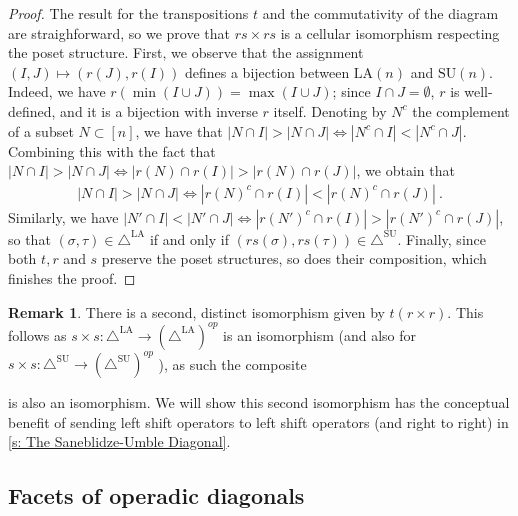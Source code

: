 \documentclass{amsart}
\theoremstyle{definition}
\newtheorem{remark}[theorem]{Remark}
\newcommand{\SU}{\mathrm{SU}}
\newcommand{\LA}{\mathrm{LA}}
\newcommand{\SUD}{\triangle^{\mathrm{SU}}}
\newcommand{\LAD}{\triangle^{\mathrm{LA}}}
\newcommand{\op}{\mathrm{op}}
\begin{document}
\begin{proof}
    The result for the transpositions $t$ and the commutativity of the diagram are straighforward, so we prove that $rs\times rs$ is a cellular isomorphism respecting the poset structure. 
    First, we observe that the assignment $(I,J) \mapsto (r(J),r(I))$ defines a bijection between $\LA(n)$ and $\SU(n)$. 
    Indeed, we have $r(\min(I\cup J))=\max(I\cup J)$; since $I \cap J = \emptyset$, $r$ is well-defined, and it is a bijection with inverse $r$ itself.  
    Denoting by $N^c$ the complement of a subset $N \subset [n]$, we have that $|N \cap I| > |N\cap J| \iff |N^c \cap I|< |N^c \cap J|$.
    Combining this with the fact that $|N \cap I| > |N\cap J| \iff |r(N) \cap r(I)| > |r(N) \cap r(J)|$, we obtain that 
    \begin{eqnarray*}
        |N \cap I| > |N\cap J| \iff |r(N)^c \cap r(I)| < |r(N)^c \cap r(J)| \ .
    \end{eqnarray*}
    Similarly, we have $|N' \cap I| < |N'\cap J| \iff |r(N')^c \cap r(I)| > |r(N')^c \cap r(J)|$, so that $(\sigma,\tau) \in \LAD$ if and only if $(rs(\sigma),rs(\tau)) \in \SUD$. 
    Finally, since both $t,r$ and $s$ preserve the poset structures, so does their composition, which finishes the proof.
\end{proof}

\begin{remark} \label{rem:Alternate Isomorphism}
There is a second, distinct isomorphism given by $t(r\times r)$.
This follows as $s\times s:\LAD \to (\LAD)^{op}$ is an isomorphism (and also for  $s\times s:\SUD \to (\SUD)^{op}$ ), as such the composite 

\begin{center}
\end{center}
is also an isomorphism.
We will show this second isomorphism has the conceptual benefit of sending left shift operators to left shift operators (and right to right) in \cref{s: The Saneblidze-Umble Diagonal}.

\end{remark}


\subsection{Facets of operadic diagonals}
\end{document}
